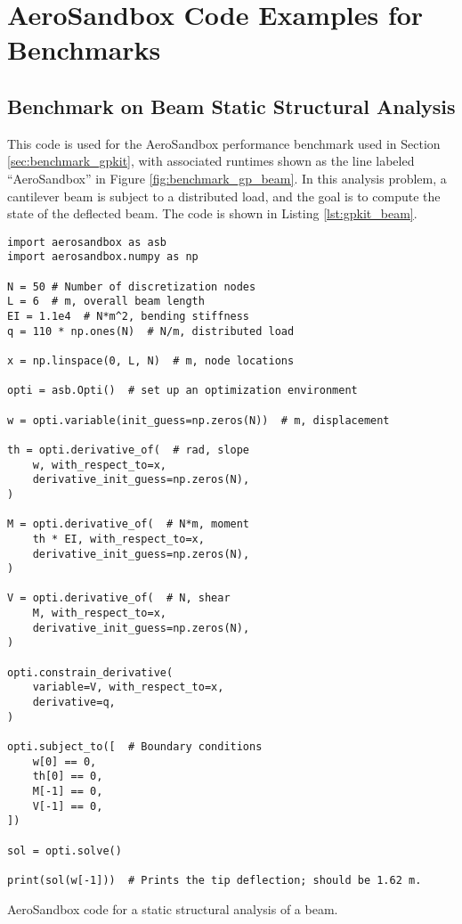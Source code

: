 \chapter{AeroSandbox Code Examples for Benchmarks}
\label{chap:code}


\section{Benchmark on Beam Static Structural Analysis}

This code is used for the AeroSandbox performance benchmark used in Section \ref{sec:benchmark_gpkit}, with associated runtimes shown as the line labeled ``AeroSandbox'' in Figure \ref{fig:benchmark_gp_beam}. In this analysis problem, a cantilever beam is subject to a distributed load, and the goal is to compute the state of the deflected beam. The code is shown in Listing \ref{lst:gpkit_beam}.

\begin{listing}[h]
    \begin{verbatim}
import aerosandbox as asb
import aerosandbox.numpy as np

N = 50 # Number of discretization nodes
L = 6  # m, overall beam length
EI = 1.1e4  # N*m^2, bending stiffness
q = 110 * np.ones(N)  # N/m, distributed load

x = np.linspace(0, L, N)  # m, node locations

opti = asb.Opti()  # set up an optimization environment

w = opti.variable(init_guess=np.zeros(N))  # m, displacement

th = opti.derivative_of(  # rad, slope
    w, with_respect_to=x,
    derivative_init_guess=np.zeros(N),
)

M = opti.derivative_of(  # N*m, moment
    th * EI, with_respect_to=x,
    derivative_init_guess=np.zeros(N),
)

V = opti.derivative_of(  # N, shear
    M, with_respect_to=x,
    derivative_init_guess=np.zeros(N),
)

opti.constrain_derivative(
    variable=V, with_respect_to=x,
    derivative=q,
)

opti.subject_to([  # Boundary conditions
    w[0] == 0,
    th[0] == 0,
    M[-1] == 0,
    V[-1] == 0,
])

sol = opti.solve()

print(sol(w[-1]))  # Prints the tip deflection; should be 1.62 m.
    \end{verbatim}
    \caption{AeroSandbox code for a static structural analysis of a beam.}
    \label{lst:gpkit_beam}
\end{listing}
